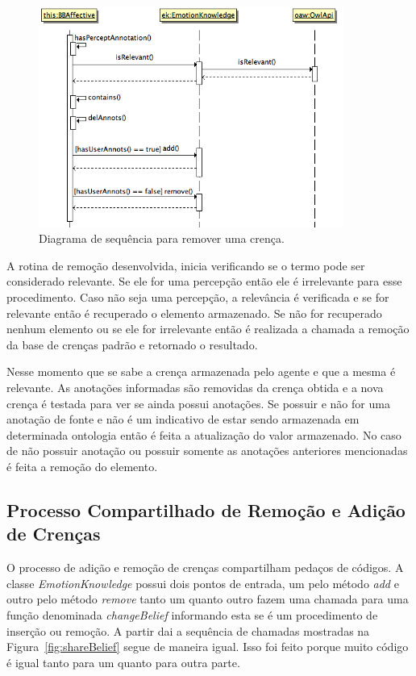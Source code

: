 \begin{figure}
  \centering
  \includegraphics[width=10cm]{figuras/delB.png}
  \caption{Diagrama de sequência para remover uma crença.}
  \label{fig:delBelief}
\end{figure}

A rotina de remoção desenvolvida, inicia verificando se o termo pode ser
considerado relevante. Se ele for uma percepção então ele é irrelevante para
esse procedimento. Caso não seja uma percepção, a relevância é verificada e
se for relevante então é recuperado o elemento armazenado. Se não for
recuperado nenhum elemento ou se ele for irrelevante então é realizada a
chamada a remoção da base de crenças padrão e retornado o resultado.

Nesse momento que se sabe a crença armazenada pelo agente e que a mesma
é relevante. As anotações informadas são removidas da crença obtida e a nova
crença é testada para ver se ainda possui anotações. Se possuir e não for uma
anotação de fonte e não é um indicativo de estar sendo armazenada em
determinada ontologia então é feita a atualização do valor armazenado. No caso
de não possuir anotação ou possuir somente as anotações anteriores mencionadas
é feita a remoção do elemento.

\subsection{Processo Compartilhado de Remoção e Adição de Crenças}

O processo de adição e remoção de crenças compartilham pedaços de códigos. A
classe \emph{EmotionKnowledge} possui dois pontos de entrada, um pelo método
\emph{add} e outro pelo método \emph{remove} tanto um quanto outro fazem uma
chamada para uma função denominada \emph{changeBelief} informando esta se é um
procedimento de inserção ou remoção. A partir dai a sequência de chamadas
mostradas na Figura~\ref{fig:shareBelief} segue de maneira igual. Isso foi
feito porque muito código é igual tanto para um quanto para outra parte.

